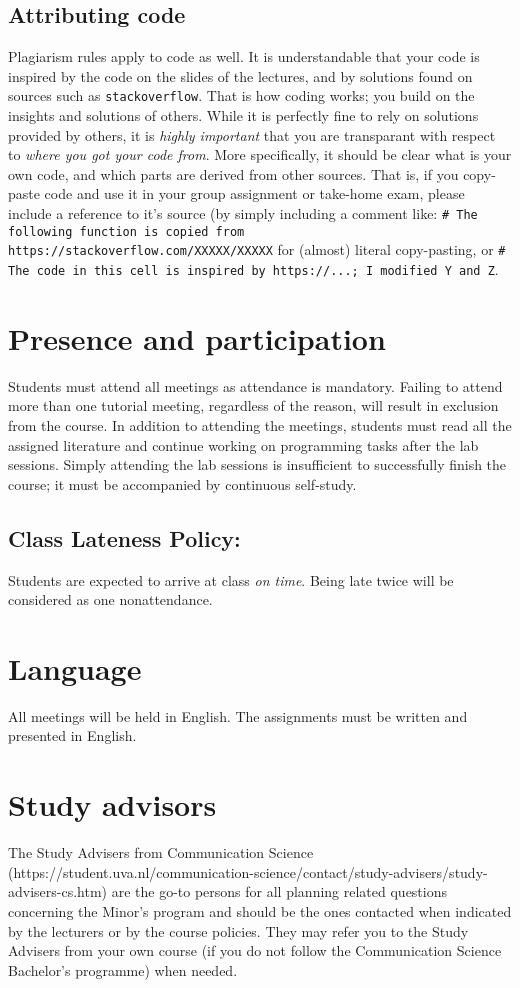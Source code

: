 \documentclass[a4paper,10pt,twocolumn]{report}
\begin{document}
\subsection{Attributing code}
Plagiarism rules apply to code as well. It is understandable that your code is inspired by the code on the slides of the lectures, and by solutions found on sources such as \texttt{stackoverflow}. That is how coding works; you build on the insights and solutions of others. While it is perfectly fine to rely on solutions provided by others, it is \emph{highly important} that you are transparant with respect to \emph{where you got your code from}. More specifically, it should be clear what is your own code, and which parts are derived from other sources. That is, if you copy-paste code and use it in your group assignment or take-home exam, please include a reference to it's source (by simply including a comment like: \texttt{\# The following function is copied from https://stackoverflow.com/XXXXX/XXXXX} for (almost) literal copy-pasting, or \texttt{\# The code in this cell is inspired by https://...; I modified Y and Z}. 

\section{Presence and participation}
Students must attend all meetings as attendance is mandatory. Failing to attend more than one tutorial meeting, regardless of the reason, will result in exclusion from the course. In addition to attending the meetings, students must read all the assigned literature and continue working on programming tasks after the lab sessions. Simply attending the lab sessions is insufficient to successfully finish the course; it must be accompanied by continuous self-study.

	
\subsection{Class Lateness Policy:} Students are expected to arrive at class \emph{on time}. Being late twice will be considered as one nonattendance. \\

\section{Language}
All meetings will be held in English. The assignments must be written and presented in English. 

\section{Study advisors}
The Study Advisers from Communication Science (https://student.uva.nl/communication-science/contact/study-advisers/study-advisers-cs.htm) are the go-to persons for all planning related questions concerning the Minor’s program and should be the ones contacted when indicated by the lecturers or by the course policies. They may refer you to the Study Advisers from your own course (if you do not follow the Communication Science Bachelor’s programme) when needed. 
\end{document}
